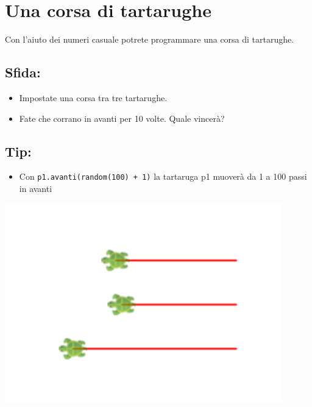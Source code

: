\chapter{Una corsa di tartarughe}
\begin{multicols}{2}
Con l'aiuto dei numeri casuale potrete programmare una corsa di tartarughe.
\section*{\color{BrickRed}Sfida:}


\begin{itemize}

\item {Impostate una corsa tra tre tartarughe.}
\item {Fate che corrano in avanti per 10 volte. Quale vincerà?}

\end{itemize}


\section*{\color{OliveGreen}Tip:}


\begin{itemize}

\item {Con \lstinline{p1.avanti(random(100) + 1)} la tartaruga p1 muoverà da 1 a 100 passi in avanti}

\end{itemize}



\columnbreak

\begin{center}
\includegraphics[width=12.0cm]{../img/race.png}
\end{center}

\end{multicols}

